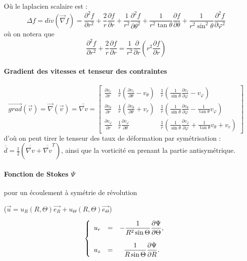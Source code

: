 Où le laplacien scalaire est :
$$\Delta f=div \left( \vec{\nabla} f \right)=\frac{\partial^2 f}{\partial r^2} + \frac{2}{r} \frac{\partial f}{\partial r} + \frac{1}{r^2} \frac{\partial^2 f}{\partial \theta^2} + \frac{1}{r^2 \tan \theta} \frac{\partial f}{\partial \theta} + \frac{1}{r^2 \sin^2 \theta} \frac{\partial^2 f}{\partial \varphi^2} $$
\noindent où on notera que $$\frac{\partial^2 f}{\partial r^2} + \frac{2}{r} \frac{\partial f}{\partial r}=\frac{1}{r^2} \frac{\partial}{\partial r} \left( r^2 \frac{\partial f}{\partial r} \right) $$



\paragraph{Gradient des vitesses et tenseur des contraintes}


$$
\vec{grad} \left( \vec{v} \right) = \vec{\nabla} \left( \vec{v} \right) =\overline{\overline{\nabla v}}=
\begin{bmatrix}
\frac{\partial v_r}{\partial r} & \frac{1}{r} \left( \frac{\partial v_r}{\partial \theta} - v_\theta \right) & \frac{1}{r} \left( \frac{1}{\sin \theta} \frac{\partial v_r}{\partial \varphi} - v_\varphi \right) \\
\frac{\partial v_\theta}{\partial r} & \frac{1}{r} \left( \frac{\partial v_\theta}{\partial \theta} + v_r \right) & \frac{1}{r} \left( \frac{1}{\sin \theta} \frac{\partial v_\theta}{\partial \varphi} - \frac{1}{\tan \theta} v_\varphi \right) \\
\frac{\partial v_\varphi}{\partial r} & \frac{1}{r} \frac{\partial v_\varphi}{\partial \theta} &  \frac{1}{r} \left( \frac{1}{\sin \theta} \frac{\partial v_\varphi}{\partial \varphi} + \frac{1}{\tan \theta} v_\theta + v_r \right)
\end{bmatrix}
$$
\noindent d'où on peut tirer le tenseur des taux de déformation par symétrisation : $\overline{\overline{d}}=\frac{1}{2} \left( \overline{\overline{\nabla v}} + \overline{\overline{\nabla v}}^T \right)$, ainsi que la vorticité en prenant la partie antisymétrique.


\paragraph{Fonction de Stokes $\Psi$}  pour un écoulement à symétrie de révolution

($\vec{u} = u_R(R,\Theta) \vec{e_R} + u_\Theta(R,\Theta) \vec{e_\Theta}$)


\begin{equation}
\left\{
\begin{array}{ccc}
\displaystyle u_r &=& \displaystyle - \frac{1}{R^2 \sin \Theta }\frac {\partial \Psi} {\partial \Theta}, \\ \\
\displaystyle u_z &=& \displaystyle  \frac{1}{R \sin \Theta}\frac {\partial \Psi} {\partial R}.
\end{array}
\right.
\end{equation}



